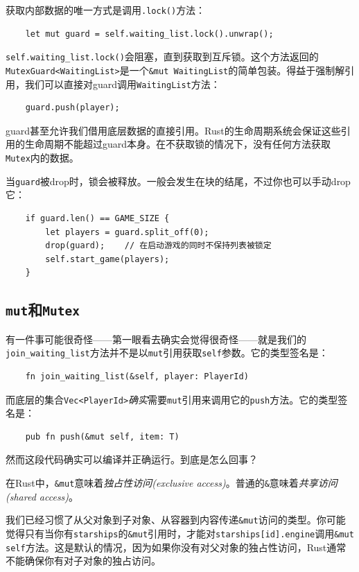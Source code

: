获取内部数据的唯一方式是调用\texttt{.lock()}方法：
\begin{verbatim}
    let mut guard = self.waiting_list.lock().unwrap();
\end{verbatim}

\texttt{self.waiting\_list.lock()}会阻塞，直到获取到互斥锁。这个方法返回的\texttt{MutexGuard<WaitingList>}是一个\texttt{\&mut WaitingList}的简单包装。得益于强制解引用，我们可以直接对guard调用\texttt{WaitingList}方法：
\begin{verbatim}
    guard.push(player);
\end{verbatim}

guard甚至允许我们借用底层数据的直接引用。Rust的生命周期系统会保证这些引用的生命周期不能超过guard本身。在不获取锁的情况下，没有任何方法获取\texttt{Mutex}内的数据。

当\texttt{guard}被drop时，锁会被释放。一般会发生在块的结尾，不过你也可以手动drop它：
\begin{verbatim}
    if guard.len() == GAME_SIZE {
        let players = guard.split_off(0);
        drop(guard);    // 在启动游戏的同时不保持列表被锁定
        self.start_game(players);
    }
\end{verbatim}

\subsection{\texttt{mut}和\texttt{Mutex}}\label{MutAndMutex}
有一件事可能很奇怪——第一眼看去确实会觉得很奇怪——就是我们的\texttt{join\_waiting\_list}方法并不是以\texttt{mut}引用获取\texttt{self}参数。它的类型签名是：
\begin{verbatim}
    fn join_waiting_list(&self, player: PlayerId)
\end{verbatim}

而底层的集合\texttt{Vec<PlayerId>}\emph{确实}需要\texttt{mut}引用来调用它的\texttt{push}方法。它的类型签名是：
\begin{verbatim}
    pub fn push(&mut self, item: T)
\end{verbatim}

然而这段代码确实可以编译并正确运行。到底是怎么回事？

在Rust中，\texttt{\&mut}意味着\emph{独占性访问(exclusive access)}。普通的\texttt{\&}意味着\emph{共享访问(shared access)}。

我们已经习惯了从父对象到子对象、从容器到内容传递\texttt{\&mut}访问的类型。你可能觉得只有当你有\texttt{starships}的\texttt{\&mut}引用时，才能对\texttt{starships[id].engine}调用\texttt{\&mut self}方法。这是默认的情况，因为如果你没有对父对象的独占性访问，Rust通常不能确保你有对子对象的独占访问。

